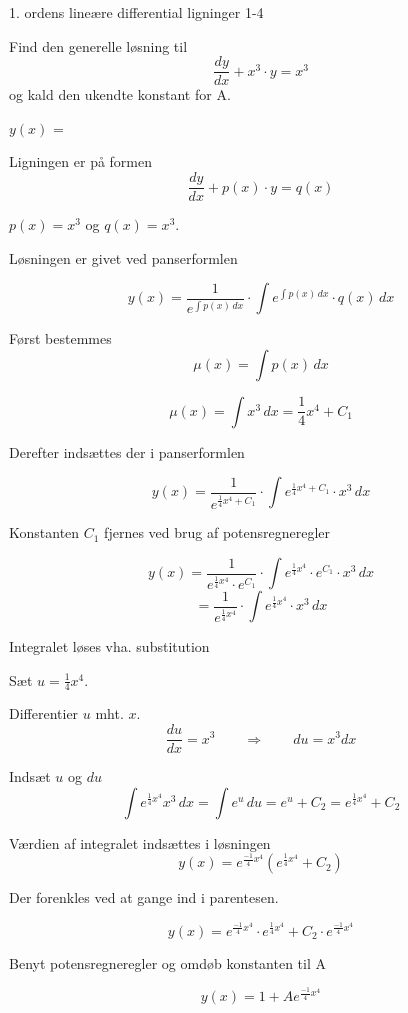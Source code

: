\documentclass{article}
\begin{document}
\begin{exercise}{1. ordens lineære differential ligninger 1-4}
	
	
	Find den generelle løsning til
	\[
	\frac{dy}{dx} + x^3 \cdot y = x^3
	\]
	og kald den ukendte konstant for A.
	
	$y(x)$ =  
	
	
	
	\hint
	
	Ligningen er på formen
	\[
	\frac{dy}{dx} + p(x) \cdot y = q(x)
	\]
	
	\hint
	
	$p(x)=x^3$ og $q(x)=x^3$.
	
	\hint
	
	Løsningen er givet ved panserformlen
	
	
	\hint
	
	\[
	y(x) = \frac{1}{e^{\int p(x) \, dx}} \cdot \int e^{\int p(x) \, dx}  \cdot q(x) \, dx
	\]
	
	\hint
	
	Først bestemmes 
	\[
	\mu(x) = \int p(x) \, dx
	\]
	
	\hint
	\[
	\mu(x) = \int x^3 \, dx = \frac{1}{4} x^4 + C_1
	\]
	
	\hint
	Derefter indsættes der i  panserformlen
	
	\hint
	
	\[
	y(x) = \frac{1}{e^{\frac{1}{4}x^4 + C_1}} \cdot \int e^{\frac{1}{4}x^4 + C_1}  \cdot x^3 \, dx
	\]
	
	
	\hint
	
	Konstanten $C_1$ fjernes ved brug af potensregneregler
	
	\hint
	\[
	y(x) = \frac{1}{e^{\frac{1}{4}x^4} \cdot e^{C_1}} \cdot \int e^{\frac{1}{4}x^4} \cdot e^{C_1}  \cdot x^3 \, dx 
	\]
	\[
	= \frac{1}{e^{\frac{1}{4}x^4}} \cdot \int e^{\frac{1}{4}x^4}  \cdot x^3 \, dx
	\]
	
	\hint
	
	Integralet løses vha. substitution
	
	
	\hint
	Sæt $u = \frac{1}{4}x^4$.
	
	\hint
	
	Differentier $u$ mht. $x$.
	\[
	\frac{du}{dx} = x^3 \qquad	\Rightarrow \qquad du = x^3 dx
	\]
	
	\hint 
	Indsæt $u$ og $du$
	\[
	\int e^{\frac{1}{4}x^4}x^3 \, dx = \int e^{u} \, du = e^{u} + C_2 = e^{\frac{1}{4}x^4} + C_2
	\]
	
	\hint
	
	Værdien af integralet indsættes i løsningen
	\[
	y(x) = e^{\frac{-1}{4}x^4} \left( e^{\frac{1}{4}x^4}+ C_2\right)
	\]
	
	\hint
	
	Der forenkles ved at gange ind i parentesen.
	
	\hint
	\[
	y(x) = e^{\frac{-1}{4}x^4} \cdot e^{\frac{1}{4}x^4} + C_2 \cdot e^{\frac{-1}{4}x^4} 
	\]
	
	\hint
	
	Benyt potensregneregler og omdøb konstanten til A
	
	\hint
	\[
	y(x) = 1 + A e^{\frac{-1}{4}x^4}
	\]
	
	
\end{exercise}
\end{document}
